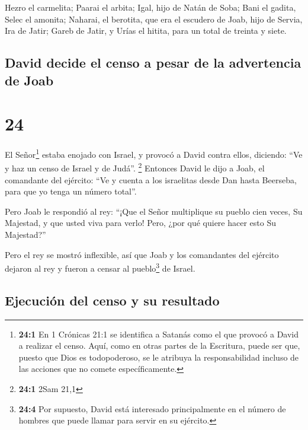 Hezro el carmelita; Paarai el arbita; 
Igal, hijo de Natán de Soba; Bani el gadita,  Selec el
amonita; Naharai, el berotita, que era el escudero de Joab, hijo de
Servia,  Ira de Jatir; Gareb de Jatir,  y
Urías el hitita, para un total de treinta y siete.

\hypertarget{david-decide-el-censo-a-pesar-de-la-advertencia-de-joab}{%
\subsection{David decide el censo a pesar de la advertencia de
Joab}\label{david-decide-el-censo-a-pesar-de-la-advertencia-de-joab}}

\hypertarget{section-23}{%
\section{24}\label{section-23}}

 El Señor\footnote{\textbf{24:1} En 1 Crónicas 21:1 se
  identifica a Satanás como el que provocó a David a realizar el censo.
  Aquí, como en otras partes de la Escritura, puede ser que, puesto que
  Dios es todopoderoso, se le atribuya la responsabilidad incluso de las
  acciones que no comete específicamente.} estaba enojado con Israel, y
provocó a David contra ellos, diciendo: ``Ve y haz un censo de Israel y
de Judá''. \footnote{\textbf{24:1} 2Sam 21,1}  Entonces
David le dijo a Joab, el comandante del ejército: ``Ve y cuenta a los
israelitas desde Dan hasta Beerseba, para que yo tenga un número
total''.

 Pero Joab le respondió al rey: ``¡Que el Señor
multiplique su pueblo cien veces, Su Majestad, y que usted viva para
verlo! Pero, ¿por qué quiere hacer esto Su Majestad?''

 Pero el rey se mostró inflexible, así que Joab y los
comandantes del ejército dejaron al rey y fueron a censar al
pueblo\footnote{\textbf{24:4} Por supuesto, David está interesado
  principalmente en el número de hombres que puede llamar para servir en
  su ejército.} de Israel.

\hypertarget{ejecuciuxf3n-del-censo-y-su-resultado}{%
\subsection{Ejecución del censo y su
resultado}\label{ejecuciuxf3n-del-censo-y-su-resultado}}

